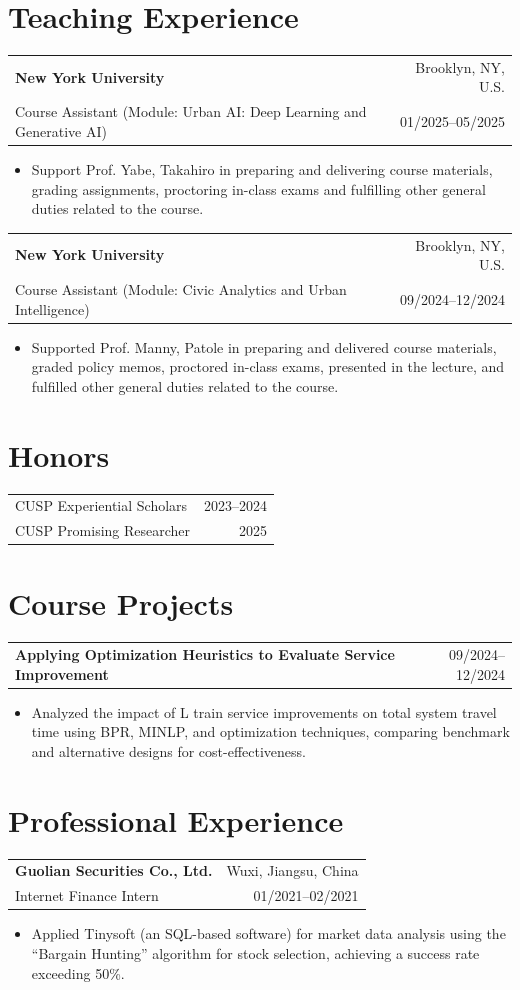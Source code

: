\documentclass[10pt,letterpaper]{article}
\makeatletter
\newcommand{\entry}[4]{%
  \begin{tabularx}{\textwidth}{@{}Xr@{}}
    \textbf{#1} & #3 \\
    #2 & #4 \\
  \end{tabularx}
}
\makeatother
\begin{document}
\section*{Teaching Experience}
\entry{New York University}{Course Assistant (Module: Urban AI: Deep Learning and Generative AI)}{Brooklyn, NY, U.S.}{01/2025--05/2025}
\begin{itemize}
  \item Support Prof. Yabe, Takahiro in preparing and delivering course materials, grading assignments, proctoring in-class exams and fulfilling other general duties related to the course.
\end{itemize}

\entry{New York University}{Course Assistant (Module: Civic Analytics and Urban Intelligence)}{Brooklyn, NY, U.S.}{09/2024--12/2024}
\begin{itemize}
  \item Supported Prof. Manny, Patole in preparing and delivered course materials, graded policy memos, proctored in-class exams, presented in the lecture, and fulfilled other general duties related to the course.
\end{itemize}

\section*{Honors}
\begin{tabularx}{\textwidth}{@{}Xr@{}}
CUSP Experiential Scholars & 2023--2024\\
CUSP Promising Researcher & 2025
\end{tabularx}

\section*{Course Projects}
\begin{tabularx}{\textwidth}{@{}Xr@{}}
\textbf{Applying Optimization Heuristics to Evaluate Service Improvement} & 09/2024--12/2024
\end{tabularx}
\begin{itemize}
  \item Analyzed the impact of L train service improvements on total system travel time using BPR, MINLP, and optimization techniques, comparing benchmark and alternative designs for cost-effectiveness.
\end{itemize}

\section*{Professional Experience}
\entry{Guolian Securities Co., Ltd.}{Internet Finance Intern}{Wuxi, Jiangsu, China}{01/2021--02/2021}
\begin{itemize}
  \item Applied Tinysoft (an SQL-based software) for market data analysis using the ``Bargain Hunting'' algorithm for stock selection, achieving a success rate exceeding 50\%.
\end{itemize}
\end{document}
